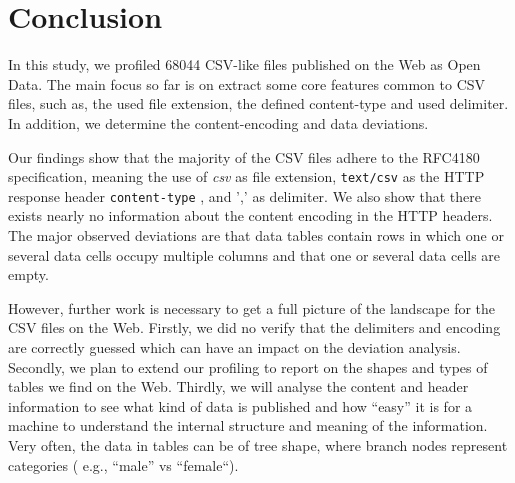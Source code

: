 \documentclass{scrartcl}
\begin{document}
\section{Conclusion}
In this study, we profiled 68044 CSV-like files published on the Web as Open Data. The main focus so far is on extract some core features common to CSV files, such as, the used file extension, the defined content-type and used delimiter. In addition, we determine the content-encoding and data deviations. 

Our findings show that the majority of the CSV files adhere to the RFC4180 specification, meaning the use of \textit{csv} as file extension, \texttt{text/csv} as the HTTP response header \texttt{content-type} , and ',' as delimiter.
We also show that there exists nearly no information about the content encoding in the HTTP headers.
The major observed deviations are that data tables contain rows in which one or several data cells occupy multiple columns and that one or several data cells are empty.

However, further work is necessary to get a full picture of the landscape for the CSV files on the Web. 
Firstly, we did no verify that the delimiters and encoding are correctly guessed which can have an impact on the deviation analysis. 
Secondly, we plan to extend our profiling to report on the shapes and types of tables we find on the Web. 
Thirdly, we will analyse the content and header information to see what kind of data is published and how ``easy'' it is for a machine to understand the internal structure and meaning of the information. 
Very often, the data in tables can be of tree shape, where branch nodes represent categories ( e.g., ``male'' vs ``female``).


%











\printbibliography 
\end{document}
